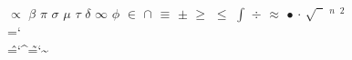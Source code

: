 {	\or \missingchar%
	\or \missingchar%
	\or \missingchar%
	\or $\propto$\relax%
	\or $\beta$\relax%
	\or {}%
	\or $\pi$\relax%
	\or {}%
	\or $\sigma$\relax%
	\or $\mu$\relax%
	\or $\tau$\relax%
	\or {}%
	\or {}%
	\or {}%
	\or $\delta$\relax%
	\or $\infty$\relax%
	\or $\phi$\relax%
	\or $\in$\relax%
	\or $\cap$\relax%
	\or $\equiv$\relax%
	\or $\pm$\relax%
	\or $\geq$\relax%
	\or $\leq$\relax%
	\or $\int$\relax%
	\or \missingchar%
	\or $\div$\relax%
	\or $\approx$\relax%
	\or {}%
	\or $\bullet$\relax%
	\or $\cdot$\relax%
	\or $\sqrt{\phantom{2}}$\relax%
	\or $^n$\relax%
	\or $^2$\relax%
	\or \vrule height1.2ex width0.3em depth0pt%
	\or \missingchar%
	\else \missingchar\fi%
}
\def\frac#1/#2{%
	\leavevmode\kern.1em
	\raise.5ex\hbox{\the\scriptfont0 #1}\kern-.1em
	/\kern-.15em\lower.25ex\hbox{\the\scriptfont0 #2}
}
\def\etagen{%
	\kern0.1em\vrule width0.05ex height1.0ex depth-0.5ex%
	\vrule width0.4em height1.0ex depth-0.95ex\kern0.1em
}
\def\missingchar{%
	\kern0.1em\vrule width0.4pt height5.8pt depth0pt%
	\vrule width5pt height0.4pt depth0pt%
	\vrule width0.4pt height5.8pt depth0pt\kern-5.4pt%
	\vrule width5.4pt height5.8pt depth-5.4pt\kern0.1em
}
%
%
\def\Acc#1#2{%
	\setbox0\hbox{\char #1}%
	\setbox1\hbox{#2}%
	\dimen0\ht1\advance\dimen0-1ex
	\leavevmode
	\hbox to\wd1{\kern.5\wd1\hss\raise\dimen0\box0\hss\kern-.5\wd1\box1}%
}
%
%
%
\chardef\\=`\\
\chardef\^=`\^		%
\chardef\~=`\~		%
\def\{{$\{$}
\def\}{$\}$}
%
%
\def\D{\Acc{"5F}}
\def\C{\Acc{"5E}}
\def\T{\Acc{"7E}}
